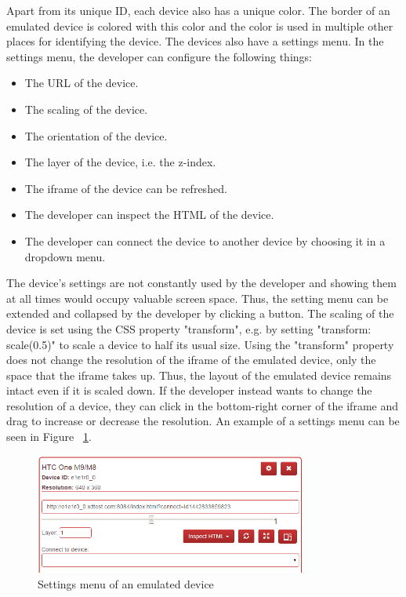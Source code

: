 Apart from its unique ID, each device also has a unique color. The border of an emulated device is colored with this color and the color is used in multiple other places for identifying the device. The devices also have a settings menu. In the settings menu, the developer can configure the following things:
\begin{itemize}
	\item The URL of the device.
	\item The scaling of the device.
	\item The orientation of the device.
	\item The layer of the device, i.e. the z-index. 
	\item The iframe of the device can be refreshed.
	\item The developer can inspect the HTML of the device.
	\item The developer can connect the device to another device by choosing it in a dropdown menu.
\end{itemize}
The device's settings are not constantly used by the developer and showing them at all times would occupy valuable screen space. Thus, the setting menu can be extended and collapsed by the developer by clicking a button. The scaling of the device is set using the CSS property "transform", e.g. by setting "transform: scale(0.5)" to scale a device to half its usual size. Using the "transform" property does not change the resolution of the iframe of the emulated device, only the space that the iframe takes up. Thus, the layout of the emulated device remains intact even if it is scaled down. If the developer instead wants to change the resolution of a device, they can click in the bottom-right corner of the iframe and drag to increase or decrease the resolution. An example of a settings menu can be seen in Figure ~\ref{fig:settings_menu}. 

\begin{figure}[H]
  \centering
    \includegraphics[width=0.8\textwidth]{images/screenshots/settings_menu_2.png}
	\caption{Settings menu of an emulated device}
	\label{fig:settings_menu}
\end{figure}

